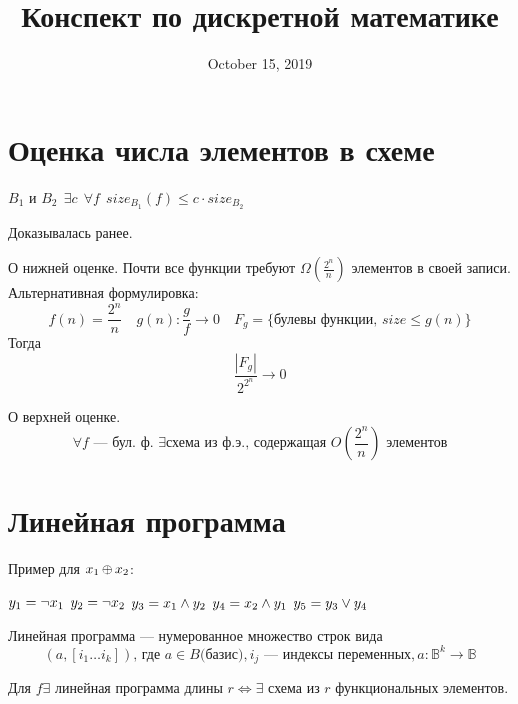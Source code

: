 

\title{Конспект по дискретной математике}

\date{October 15, 2019}



\maketitle

\section{Оценка числа элементов в схеме}

\begin{theorem}
$B_1$ и $B_2 \ \ \exists c \ \ \forall f \ \ size_{B_1}(f)\leq c\cdot size_{B_2}$
\end{theorem} Доказывалась ранее.

\begin{theorem}
О нижней оценке. Почти все функции требуют $\Omega(\frac{2^n}{n})$ элементов в своей записи. Альтернативная формулировка: $$f(n)=\frac{2^n}{n} \quad g(n): \frac{g}{f}\to 0 \quad F_g=\{\text{булевы функции, } size\leq g(n)\}$$ Тогда $$\frac{|F_g|}{2^{2^n}}\to 0$$
\end{theorem}

\begin{theorem}
О верхней оценке. $$\forall f \text{ --- бул. ф. } \exists \text{схема из ф.э., содержащая } O\left(\frac{2^n}{n}\right) \text{ элементов}$$
\end{theorem}

\section{Линейная программа}

Пример для $x_1\operatorname*{\oplus} x_2$:

\noindent
$y_1=\neg x_1\\$
$y_2=\neg x_2\\$
$y_3=x_1\wedge y_2\\$
$y_4=x_2\wedge y_1\\$
$y_5=y_3\vee y_4\\$

Линейная программа --- нумерованное множество строк вида $$(a, [i_1\ldots i_k])\text{, где } a\in B \textit{(базис)}, i_j \text{ --- индексы переменных}, a:\mathbb{B}^k\to\mathbb{B}$$

\begin{theorem}
Для $f \exists $ линейная программа длины $r \Leftrightarrow \exists$ схема из $r$ функциональных элементов.
\end{theorem}

